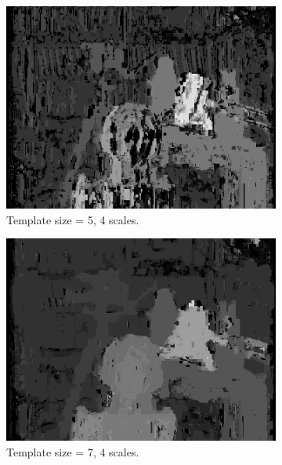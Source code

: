 \documentclass[12pt,a4paper,oneside,final]{article}
\begin{document}
\begin{figure}[H]
\ContinuedFloat
\begin{subfigure}[b]{0.24\textwidth}
	\includegraphics[width=\textwidth]{disparity_s4_k5.png}
	\caption{Template size = 5, 4 scales.}
\end{subfigure}
\begin{subfigure}[b]{0.24\textwidth}
	\includegraphics[width=\textwidth]{disparity_s4_k7.png}
	\caption{Template size = 7, 4 scales.}
\end{subfigure}
\begin{subfigure}[b]{0.24\textwidth}

\end{subfigure}
\end{figure}
\end{document}
